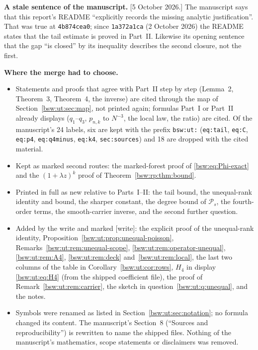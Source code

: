 \documentclass[11pt,letterpaper]{article}
\theoremstyle{definition}
\theoremstyle{remark}
\begin{document}
\textbf{A stale sentence of the manuscript.}  [5 October 2026.]  The
manuscript says that this report's README ``explicitly records the missing
analytic justification''.  That was true at \texttt{4b874cea0}; since
\texttt{1a372a1ca} (2 October 2026) the README states that the tail
estimate is proved in Part~II.  Likewise its opening sentence that the gap
``is closed'' by its inequality describes the second closure, not the
first.

\textbf{Where the merge had to choose.}
\begin{itemize}[leftmargin=2em]
\item Statements and proofs that agree with Part~II step by step (Lemma~2,
 Theorem~3, Theorem~4, the inverse) are cited through the map of
 Section~\ref{bsw:ut:sec:map}, not printed again; formulas Part~I or
 Part~II already displays ($q_1$--$q_3$, $p_{n,k}$ to $N^{-3}$, the local
 law, the ratio) are cited.  Of the manuscript's 24 labels, six are kept
 with the prefix \texttt{bsw:ut:} (\texttt{eq:tail}, \texttt{eq:C},
 \texttt{eq:p4}, \texttt{eq:q4minus}, \texttt{eq:k4}, \texttt{sec:sources})
 and 18 are dropped with the cited material.
\item Kept as marked second routes: the marked-forest proof of
 \eqref{bsw:eq:Phi-exact} and the $(1+\lambda z)^k$ proof of
 Theorem~\ref{bsw:rp:thm:bound}.
\item Printed in full as new relative to Parts~I--II: the tail bound, the
 unequal-rank identity and bound, the sharper constant, the degree bound of
 $\mathcal P_s$, the fourth-order terms, the smooth-carrier inverse, and the
 second further question.
\item Added by the write and marked [write]: the explicit proof of the
 unequal-rank identity, Proposition~\ref{bsw:ut:prop:unequal-poisson},
 Remarks~\ref{bsw:ut:rem:unequal-scope}, \ref{bsw:ut:rem:operator-unequal},
 \ref{bsw:ut:rem:A4}, \ref{bsw:ut:rem:deck} and~\ref{bsw:ut:rem:local},
 the last two columns of the table in Corollary~\ref{bsw:ut:cor:rows},
 $H_4$ in display \eqref{bsw:ut:eq:H4} (from the shipped coefficient file),
 the proof of Remark~\ref{bsw:ut:rem:carrier}, the sketch in
 question~\ref{bsw:ut:q:unequal}, and the notes.
\item Symbols were renamed as listed in
 Section~\ref{bsw:ut:sec:notation}; no formula changed its content.  The
 manuscript's Section~8 (``Sources and reproducibility'') is rewritten to
 name the shipped files.  Nothing of the manuscript's mathematics, scope
 statements or disclaimers was removed.
\end{itemize}
\end{document}
